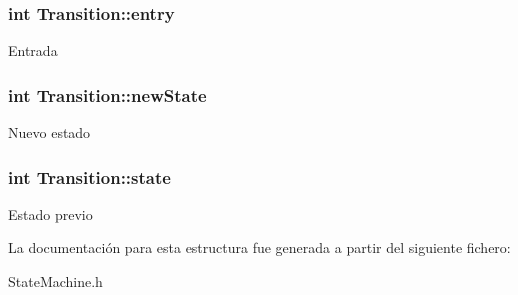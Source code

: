 \subsubsection[{entry}]{\setlength{\rightskip}{0pt plus 5cm}int Transition\+::entry}\label{structTransition_a71bfb2883c7991812e7fb3b34e258aab}
Entrada \hypertarget{structTransition_a423a2791bbcafadc339eaa3da7c7fb04}{}
\subsubsection[{new\+State}]{\setlength{\rightskip}{0pt plus 5cm}int Transition\+::new\+State}\label{structTransition_a423a2791bbcafadc339eaa3da7c7fb04}
Nuevo estado \hypertarget{structTransition_ad7509cc6401e1038e17dbeea187c15ca}{}
\subsubsection[{state}]{\setlength{\rightskip}{0pt plus 5cm}int Transition\+::state}\label{structTransition_ad7509cc6401e1038e17dbeea187c15ca}
Estado previo 

La documentación para esta estructura fue generada a partir del siguiente fichero\+:\begin{DoxyCompactItemize}
\item 
State\+Machine.\+h\end{DoxyCompactItemize}
